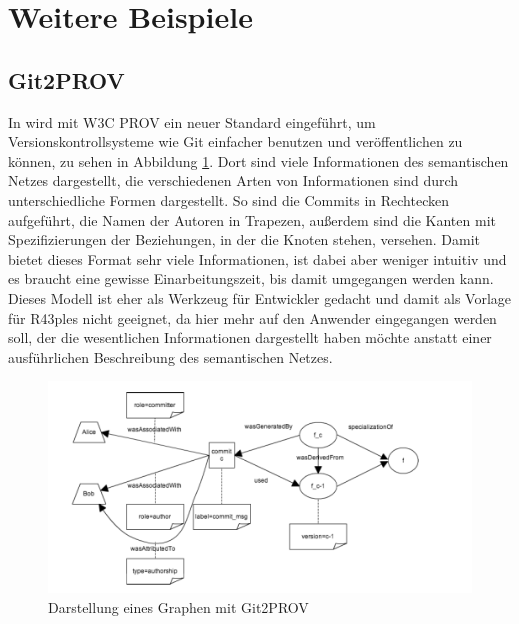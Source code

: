 \documentclass[nocolor]{tudbook}
\begin{document}
\section{Weitere Beispiele}
\label{sec:WeitereLiteratur}
\subsection{Git2PROV}
\label{sec:Git2PROV}
In \cite{Git2PROV} wird mit W3C PROV ein neuer Standard eingeführt, um Versionskontrollsysteme wie Git einfacher benutzen und veröffentlichen zu können, zu sehen in Abbildung \ref{fig:Git2PROV}. Dort sind viele Informationen des semantischen Netzes dargestellt, die verschiedenen Arten von Informationen sind durch unterschiedliche Formen dargestellt. So sind die Commits in Rechtecken aufgeführt, die Namen der Autoren in Trapezen, außerdem sind die Kanten mit Spezifizierungen der Beziehungen, in der die Knoten stehen, versehen. Damit bietet dieses Format sehr viele Informationen, ist dabei aber weniger intuitiv und es braucht eine gewisse Einarbeitungszeit, bis damit umgegangen werden kann. Dieses Modell ist eher als Werkzeug für Entwickler gedacht und damit als Vorlage für R43ples nicht geeignet, da hier mehr auf den Anwender eingegangen werden soll, der die wesentlichen Informationen dargestellt haben möchte anstatt einer ausführlichen Beschreibung des semantischen Netzes.

\begin{figure}[htbp] 
  \centering
     \includegraphics[width=\textwidth]{Git2PROV.png}
  \caption[Darstellung eines Graphen mit Git2PROV, entnommen aus \cite{Git2PROV}]{Darstellung eines Graphen mit Git2PROV}
  \label{fig:Git2PROV}
\end{figure}
\end{document}
